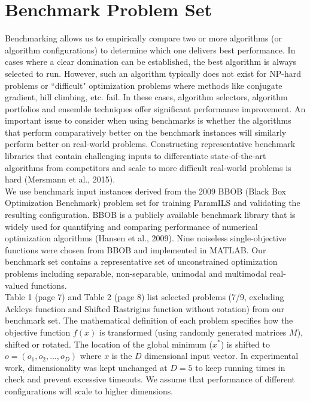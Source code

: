\section{Benchmark Problem Set}  

Benchmarking allows us to empirically compare two or more algorithms (or algorithm configurations) to determine which one delivers best performance. In cases where a clear domination can be established, the best algorithm is always selected to run. However, such an algorithm typically does not exist for NP-hard problems or ``difficult" optimization problems where methods like conjugate gradient, hill climbing, etc. fail. In these cases, algorithm selectors, algorithm portfolios and ensemble techniques offer significant performance improvement. An important issue to consider when using benchmarks is whether the algorithms that perform comparatively better on the benchmark instances will similarly perform better on real-world problems. Constructing representative benchmark libraries that contain challenging inputs to differentiate state-of-the-art algorithms from competitors and scale to more difficult real-world problems is hard (Mersmann et al., 2015).\\

We use benchmark input instances derived from the 2009 BBOB (Black Box Optimization Benchmark) problem set for training ParamILS and validating the resulting configuration. BBOB is a publicly available benchmark library that is widely used for quantifying and comparing performance of numerical optimization algorithms (Hansen et al., 2009). Nine noiseless single-objective functions were chosen from BBOB and implemented in MATLAB. Our benchmark set contains a representative set of unconstrained optimization problems including separable, non-separable, unimodal and multimodal real-valued functions.\\

Table 1 (page 7) and Table 2 (page 8) list selected problems (7/9, excluding Ackley{\vtick}s function and Shifted Rastrigin{\vtick}s function without rotation) from our benchmark set. The mathematical definition of each problem specifies how the objective function $f(x)$ is transformed (using randomly generated matrices $M$), shifted or rotated. The location of the global minimum ($x^*$) is shifted to $o = (o_{1},o_{2},...,o_{D})$ where $x$ is the $D$ dimensional input vector. In experimental work, dimensionality was kept unchanged at $D = 5$ to keep running times in check and prevent excessive timeouts. We assume that performance of different configurations will scale to higher dimensions.\\

